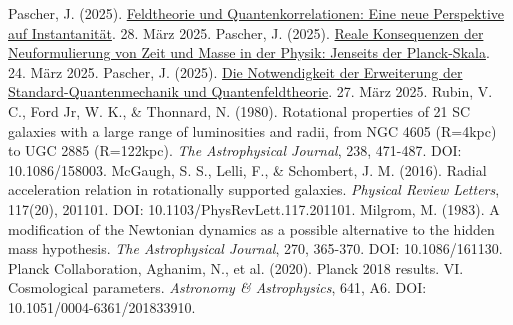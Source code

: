 \documentclass[12pt,a4paper]{article}
\begin{document}
\begin{thebibliography}{99}
		 Pascher, J. (2025). \href{https://github.com/jpascher/T0-Time-Mass-Duality/tree/main/2/pdf/Deutsch/FeldtheorieQuanten.pdf}{Feldtheorie und Quantenkorrelationen: Eine neue Perspektive auf Instantanität}. 28. März 2025.
		 Pascher, J. (2025). \href{https://github.com/jpascher/T0-Time-Mass-Duality/tree/main/2/pdf/Deutsch/JenseitsPlanck.pdf}{Reale Konsequenzen der Neuformulierung von Zeit und Masse in der Physik: Jenseits der Planck-Skala}. 24. März 2025.
		 Pascher, J. (2025). \href{https://github.com/jpascher/T0-Time-Mass-Duality/tree/main/2/pdf/Deutsch/NotwendigkeitQMErweiterung.pdf}{Die Notwendigkeit der Erweiterung der Standard-Quantenmechanik und Quantenfeldtheorie}. 27. März 2025.
		 Rubin, V. C., Ford Jr, W. K., \& Thonnard, N. (1980). Rotational properties of 21 SC galaxies with a large range of luminosities and radii, from NGC 4605 (R=4kpc) to UGC 2885 (R=122kpc). \textit{The Astrophysical Journal}, 238, 471-487. DOI: 10.1086/158003.
		 McGaugh, S. S., Lelli, F., \& Schombert, J. M. (2016). Radial acceleration relation in rotationally supported galaxies. \textit{Physical Review Letters}, 117(20), 201101. DOI: 10.1103/PhysRevLett.117.201101.
		 Milgrom, M. (1983). A modification of the Newtonian dynamics as a possible alternative to the hidden mass hypothesis. \textit{The Astrophysical Journal}, 270, 365-370. DOI: 10.1086/161130.
		 Planck Collaboration, Aghanim, N., et al. (2020). Planck 2018 results. VI. Cosmological parameters. \textit{Astronomy \& Astrophysics}, 641, A6. DOI: 10.1051/0004-6361/201833910.
	\end{thebibliography}
	
\end{document}
